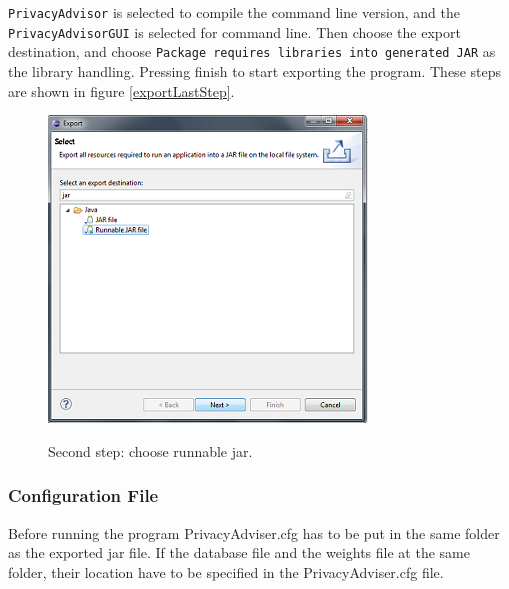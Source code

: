 \texttt{PrivacyAdvisor} is selected to compile the command line version, and the \texttt{PrivacyAdvisorGUI} is selected for command line. Then choose the export destination, and choose \texttt{Package requires libraries into generated JAR} as the library handling. Pressing finish to start exporting the program. These steps are shown in figure \ref{exportLastStep}.


  \begin{figure}[h!]
    \begin{centering}
      \vspace{-10pt}
      \includegraphics[width = .6\textwidth]{Documentation/export_jar.png}
      \vspace{-10pt}
      \caption{Second step: choose runnable jar.}
      \vspace{-10pt}
      \label{exportSecondStep}
    \end{centering}
  \end{figure}

\subsubsection{Configuration File}
Before running the program PrivacyAdviser.cfg has to be put in the same folder as the exported jar file. If the database file and the weights file at the same folder, their location have to be specified in the PrivacyAdviser.cfg file. 

